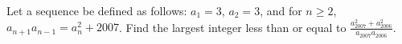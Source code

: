 Let a sequence be defined as follows: $a_{1}= 3$, $a_{2}= 3$, and for $n \ge 2$, $a_{n+1}a_{n-1}= a_{n}^{2}+2007$.  Find the largest integer less than or equal to $\frac{a_{2007}^{2}+a_{2006}^{2}}{a_{2007}a_{2006}}$.